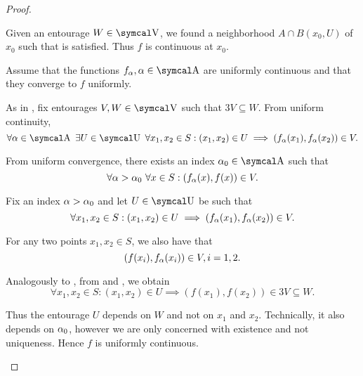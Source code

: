 \begin{proof}
\begin{description}
    Given an entourage \( W \in \CV \), we found a neighborhood \( A \cap B(x_0, U) \) of \( x_0 \) such that  is satisfied. Thus \( f \) is continuous at \( x_0 \).

     Assume that the functions \( f_\al, \al \in \CA \) are uniformly continuous and that they converge to \( f \) uniformly.

    As in , fix entourages \( V, W \in \CV \) such that \( 3V \subseteq W \). From uniform continuity,
    \begin{equation*}
      \forall \al \in \CA \ \exists U \in \CU \ \forall x_1, x_2 \in S : (x_1, x_2) \in U \implies (f_\al(x_1), f_\al(x_2)) \in V.
    \end{equation*}

    From uniform convergence, there exists an index \( \al_0 \in \CA \) such that
    \begin{equation*}
      \forall \alpha > \alpha_0 \ \forall x \in S : (f_\alpha(x), f(x)) \in V.
    \end{equation*}

    Fix an index \( \alpha > \alpha_0 \) and let \( U \in \CU \) be such that
    \begin{equation}\label{def:uniform_limit_of_continuous_functions/uniform/continuity}
      \forall x_1, x_2 \in S : (x_1, x_2) \in U \implies (f_\alpha(x_1), f_\alpha(x_2)) \in V.
    \end{equation}

    For any two points \( x_1, x_2 \in S \), we also have that
    \begin{equation}\label{def:uniform_limit_of_continuous_functions/uniform/convergence}
      (f(x_i), f_\alpha(x_i)) \in V, i = 1, 2.
    \end{equation}

    Analogously to , from  and , we obtain
    \begin{equation*}
      \forall x_1, x_2 \in S : (x_1, x_2) \in U \implies (f(x_1), f(x_2)) \in 3V \subseteq W.
    \end{equation*}

    Thus the entourage \( U \) depends on \( W \) and not on \( x_1 \) and \( x_2 \). Technically, it also depends on \( \alpha_0 \), however we are only concerned with existence and not uniqueness. Hence \( f \) is uniformly continuous.
  \end{description}
\end{proof}


